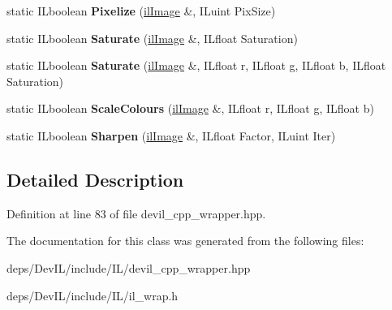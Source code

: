 \begin{DoxyCompactItemize}
static I\+Lboolean {\bfseries Pixelize} (\hyperlink{classilImage}{il\+Image} \&, I\+Luint Pix\+Size)
\item 
\mbox{\label{classilFilters_ac2ca65e50864dcd6375412bd4fcd5616}} 
static I\+Lboolean {\bfseries Saturate} (\hyperlink{classilImage}{il\+Image} \&, I\+Lfloat Saturation)
\item 
\mbox{\label{classilFilters_a7af968f4b03f426cdfa31792addbd2ca}} 
static I\+Lboolean {\bfseries Saturate} (\hyperlink{classilImage}{il\+Image} \&, I\+Lfloat r, I\+Lfloat g, I\+Lfloat b, I\+Lfloat Saturation)
\item 
\mbox{\label{classilFilters_a3df1598d6184b8d0e06514c11cab603a}} 
static I\+Lboolean {\bfseries Scale\+Colours} (\hyperlink{classilImage}{il\+Image} \&, I\+Lfloat r, I\+Lfloat g, I\+Lfloat b)
\item 
\mbox{\label{classilFilters_a9baffa0bea289a992575a98350851012}} 
static I\+Lboolean {\bfseries Sharpen} (\hyperlink{classilImage}{il\+Image} \&, I\+Lfloat Factor, I\+Luint Iter)
\end{DoxyCompactItemize}


\subsection{Detailed Description}


Definition at line 83 of file devil\+\_\+cpp\+\_\+wrapper.\+hpp.



The documentation for this class was generated from the following files\+:\begin{DoxyCompactItemize}
\item 
deps/\+Dev\+I\+L/include/\+I\+L/devil\+\_\+cpp\+\_\+wrapper.\+hpp\item 
deps/\+Dev\+I\+L/include/\+I\+L/il\+\_\+wrap.\+h\end{DoxyCompactItemize}
